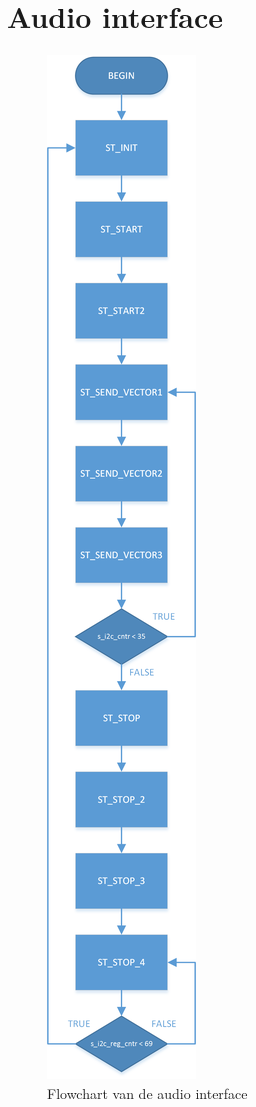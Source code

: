 \newpage
\section{Audio interface}
\label{sec:appAudioIf}
	\begin{figure}[H]
		\centering
		\includegraphics[height=0.85\textheight]{Appendix/FlowCharts/Audio_if}
		\caption{Flowchart van de audio interface}
		\label{fig:FlowChartAudioIF}
	\end{figure}

